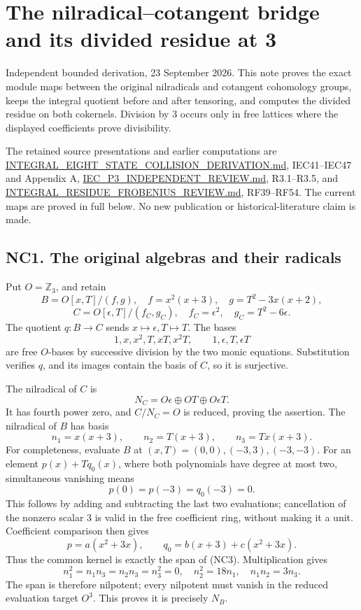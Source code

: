 \documentclass[
  10pt,
]{article}
\author{}
\date{}
\begin{document}
\section{The nilradical--cotangent bridge and its divided residue at
3}\label{the-nilradicalcotangent-bridge-and-its-divided-residue-at-3}

Independent bounded derivation, 23 September 2026. This note proves the
exact module maps between the original nilradicals and cotangent
cohomology groups, keeps the integral quotient before and after
tensoring, and computes the divided residue on both cokernels. Division
by 3 occurs only in free lattices where the displayed coefficients prove
divisibility.

The retained source presentations and earlier computations are
\url{INTEGRAL_EIGHT_STATE_COLLISION_DERIVATION.md}, IEC41--IEC47 and
Appendix A, \url{IEC_P3_INDEPENDENT_REVIEW.md}, R3.1--R3.5, and
\url{INTEGRAL_RESIDUE_FROBENIUS_REVIEW.md}, RF39--RF54. The current maps
are proved in full below. No new publication or historical-literature
claim is made.

\subsection{NC1. The original algebras and their
radicals}\label{nc1.-the-original-algebras-and-their-radicals}

Put \(O=\mathbb Z_3\), and retain \[
B=O[x,T]/(f,g),\quad
f=x^2(x+3),\quad g=T^2-3x(x+2),
\] \[
C=O[\epsilon,T]/(f_C,g_C),\quad
f_C=\epsilon^2,\quad g_C=T^2-6\epsilon.
\tag{NC1}
\] The quotient \(q:B\to C\) sends \(x\mapsto\epsilon,T\mapsto T\). The
bases \[
1,x,x^2,T,xT,x^2T,\qquad
1,\epsilon,T,\epsilon T
\tag{NC2}
\] are free \(O\)-bases by successive division by the two monic
equations. Substitution verifies \(q\), and its images contain the basis
of \(C\), so it is surjective.

The nilradical of \(C\) is \[
N_C=O\epsilon\oplus OT\oplus O\epsilon T.
\] It has fourth power zero, and \(C/N_C=O\) is reduced, proving the
assertion. The nilradical of \(B\) has basis \[
n_1=x(x+3),\qquad n_2=T(x+3),\qquad n_3=Tx(x+3).
\tag{NC3}
\] For completeness, evaluate \(B\) at \((x,T)=(0,0),(-3,3),(-3,-3)\).
For an element \(p(x)+Tq_0(x)\), where both polynomials have degree at
most two, simultaneous vanishing means \[
p(0)=p(-3)=q_0(-3)=0.
\] This follows by adding and subtracting the last two evaluations;
cancellation of the nonzero scalar 3 is valid in the free coefficient
ring, without making it a unit. Coefficient comparison then gives \[
p=a(x^2+3x),\qquad
q_0=b(x+3)+c(x^2+3x).
\] Thus the common kernel is exactly the span of (NC3). Multiplication
gives \[
n_1^2=n_1n_3=n_2n_3=n_3^2=0,\quad
n_2^2=18n_1,\quad n_1n_2=3n_3.
\] The span is therefore nilpotent; every nilpotent must vanish in the
reduced evaluation target \(O^3\). This proves it is precisely \(N_B\).
\end{document}

